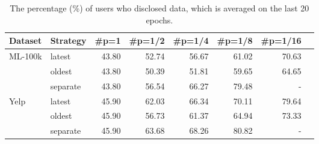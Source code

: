 

\begin{table}
    \centering
    \caption{The percentage (\%) of users who disclosed data, which is averaged on the last 20 epochs.
    }
    \label{tab:sharing_result}
    \begin{adjustbox}{max width=\linewidth}
    \begin{tabular}{@{}llrrrrrr@{}}
\toprule
{Dataset} & {Strategy} & {\#p=1}&{\#p=1/2} & {\#p=1/4}  & {\#p=1/8} & {\#p=1/16} \\ 

\midrule
\multirow{3}{*}{{ML-100k}} & {latest} & 43.80 & 52.74 &   56.67   & 61.02   & 70.63   \\ 
& {oldest} &   43.80  &  50.39  &  51.81  & 59.65 & 64.65   \\
& {separate} &   43.80  & 56.54 &  66.27   &  79.48  & -    \\
\midrule
\multirow{3}{*}{{Yelp}} & {latest} & 45.90 & 62.03 &  66.34   & 70.11   & 79.64   \\ 
& {oldest} & 45.90 & 56.73  & 61.37   & 64.94  & 73.33    \\
& {separate} &45.90  & 63.68   &  68.26  & 80.82 &-    \\
\bottomrule
\end{tabular}
\end{adjustbox}
\end{table}